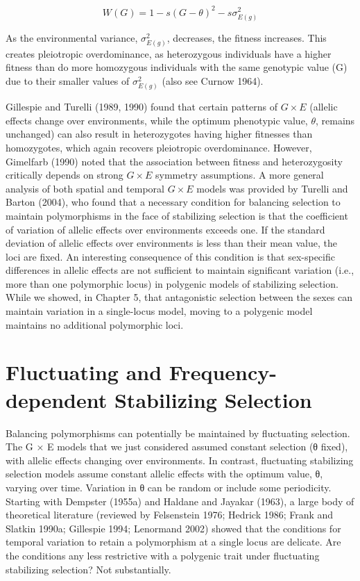 \documentclass{article}
\begin{document}
\begin{equation}
W(G)=1-s(G-\theta)^{2}-s\sigma_{E(g)}^{2}
\end{equation}

As the environmental variance,  $ \sigma_{E(g)}^{2} $, decreases, the fitness increases. This creates pleiotropic overdominance, as heterozygous individuals have a higher fitness than do more homozygous individuals with the same genotypic value (G) due to their smaller values of  $ \sigma_{E(g)}^{2} $ (also see Curnow 1964).

Gillespie and Turelli (1989, 1990) found that certain patterns of  $ G \times E $ (allelic effects change over environments, while the optimum phenotypic value,  $ \theta $, remains unchanged) can also result in heterozygotes having higher fitnesses than homozygotes, which again recovers pleiotropic overdominance. However, Gimelfarb (1990) noted that the association between fitness and heterozygosity critically depends on strong  $ G \times E $ symmetry assumptions. A more general analysis of both spatial and temporal  $ G \times E $ models was provided by Turelli and Barton (2004), who found that a necessary condition for balancing selection to maintain polymorphisms in the face of stabilizing selection is that the coefficient of variation of allelic effects over environments exceeds one. If the standard deviation of allelic effects over environments is less than their mean value, the loci are fixed. An interesting consequence of this condition is that sex-specific differences in allelic effects are not sufficient to maintain significant variation (i.e., more than one polymorphic locus) in polygenic models of stabilizing selection. While we showed, in Chapter 5, that antagonistic selection between the sexes can maintain variation in a single-locus model, moving to a polygenic model maintains no additional polymorphic loci.

\section{Fluctuating and Frequency-dependent Stabilizing Selection}
Balancing polymorphisms can potentially be maintained by fluctuating selection. The G × E models that we just considered assumed constant selection (θ fixed), with allelic effects changing over environments. In contrast, fluctuating stabilizing selection models assume constant allelic effects with the optimum value, θ, varying over time. Variation in θ can be random or include some periodicity. Starting with Dempster (1955a) and Haldane and Jayakar (1963), a large body of theoretical literature (reviewed by Felsenstein 1976; Hedrick 1986; Frank and Slatkin 1990a; Gillespie 1994; Lenormand 2002) showed that the conditions for temporal variation to retain a polymorphism at a single locus are delicate. Are the conditions any less restrictive with a polygenic trait under fluctuating stabilizing selection? Not substantially.
\end{document}
